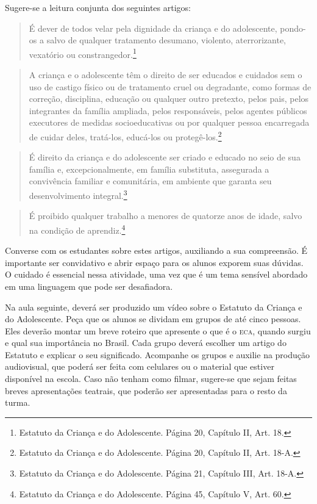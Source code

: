 \documentclass[11pt]{extarticle}
\begin{document}

Sugere-se a leitura conjunta dos seguintes artigos:

\begin{quote}É dever de todos velar pela dignidade da criança e do adolescente, pondo-os a salvo de qualquer tratamento desumano,
violento, aterrorizante, vexatório ou constrangedor.\footnote{Estatuto da Criança e do Adolescente. Página 20, Capítulo II, Art. 18.}\end{quote} 

\begin{quote}A criança e o adolescente têm o direito de ser educados e cuidados sem o uso de castigo físico ou de tratamento cruel ou degradante, como formas de correção, disciplina, educação ou qualquer outro pretexto, pelos pais, pelos integrantes da família
ampliada, pelos responsáveis, pelos agentes públicos executores de medidas socioeducativas ou por qualquer pessoa encarregada
de cuidar deles, tratá-los, educá-los ou protegê-los.\footnote{Estatuto da Criança e do Adolescente. Página 20, Capítulo II, Art. 18-A.}\end{quote} 

\begin{quote}É direito da criança e do adolescente ser criado e educado no seio de sua família e, excepcionalmente, em família substituta, assegurada a convivência familiar e comunitária, em ambiente que garanta seu desenvolvimento integral.\footnote{Estatuto da Criança e do Adolescente. Página 21, Capítulo III, Art. 18-A.}\end{quote} 

\begin{quote}É proibido qualquer trabalho a menores de quatorze anos de idade, salvo na condição de aprendiz.\footnote{Estatuto da Criança e do Adolescente. Página 45, Capítulo V, Art. 60.}\end{quote} 

Converse com os estudantes sobre estes artigos, auxiliando a sua compreensão. É importante ser convidativo e abrir espaço para os alunos exporem suas dúvidas. O cuidado é essencial nessa atividade, uma vez que é um tema sensível abordado em uma linguagem que pode ser desafiadora.

Na aula seguinte, deverá ser produzido um vídeo sobre o Estatuto da Criança e do Adolescente. Peça que os alunos se dividam em grupos de até cinco pessoas. Eles deverão montar um breve roteiro que apresente o que é o \textsc{eca}, quando surgiu e qual sua importância no Brasil. Cada grupo deverá escolher um artigo do Estatuto e explicar o seu significado. Acompanhe os grupos e auxilie na produção audiovisual, que poderá ser feita com celulares ou o material que estiver disponível na escola. Caso não tenham como filmar, sugere-se que sejam feitas breves apresentações teatrais, que poderão ser apresentadas para o resto da turma.
\end{document}
